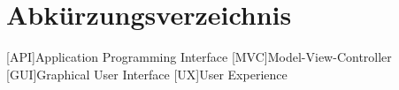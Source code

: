 \clearpage
\chapter*{Abkürzungsverzeichnis}	

\begin{acronym}[XXXXXXX]
	[API]{Application Programming Interface}
	[MVC]{Model-View-Controller}
	[GUI]{Graphical User Interface}
	[UX]{User Experience}
\end{acronym}
